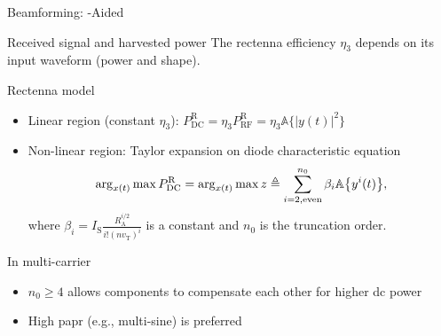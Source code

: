 \documentclass[presentation,xcolor={table},9pt]{beamer}
\begin{document}
\begin{section}{Beamforming: -Aided }
	\begin{frame}{Received signal and harvested power}
		The rectenna efficiency $\eta_3$ depends on its input waveform (power and shape).
		\begin{block}{Rectenna model}
			\begin{itemize}
				\item Linear region (constant $\eta_3$): $P_{\mathrm{DC}}^\mathrm{R} = \eta_3 P_\mathrm{RF}^\mathrm{R} = \eta_3 \mathbb{A}\bigl\{ \lvert y(t) \rvert^2 \bigr\}$
				\item Non-linear region: Taylor expansion on diode characteristic equation
				\vspace{-0.25cm}
				\begin{equation*}
					\arg_{x(t)} \max P_{\mathrm{DC}}^\mathrm{R} = \arg_{x(t)} \max z \triangleq \sum_{i=2,\text{even}}^{n_0} \beta_i \mathbb{A}\bigl\{ y^i(t) \bigr\},
					\vspace{-0.5cm}
				\end{equation*}
				where $\beta_i = I_\mathrm{S} \frac{R_\mathrm{A}^{i/2}}{i!(n v_\mathrm{T})^i}$ is a constant and $n_0$ is the truncation order.
			\end{itemize}
		\end{block}
		\begin{alertblock}{In multi-carrier  \textellipsis}
			\begin{itemize}
				\item $n_0 \ge 4$ allows components to compensate each other for higher \gls{dc} power
				\item High \gls{papr} (e.g., multi-sine) is preferred \cite{Trotter2009}
			\end{itemize}
			\vspace{-0.5cm}
			\begin{figure}
				\centering
				\subfloat{
					\resizebox{!}{2.5cm}{
}}
\end{figure}
\end{alertblock}
\end{frame}
\end{section}
\end{document}
